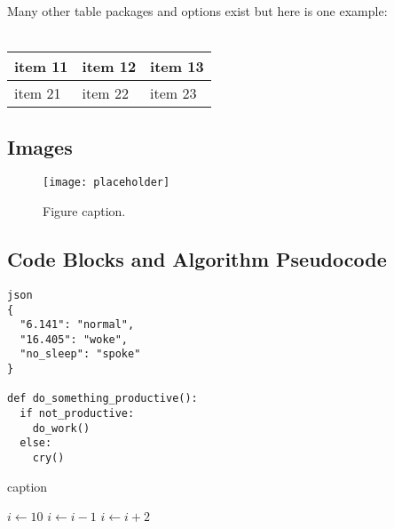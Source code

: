\documentclass{article}
\begin{document}
Many other table packages and options exist but here is one example:\\\\

\begin{tabularx}{0.8\textwidth} {
  | >{\raggedright\arraybackslash}X
  | >{\centering\arraybackslash}X
  | >{\raggedleft\arraybackslash}X | }
 \hline
 item 11 & item 12 & item 13 \\
 \hline
 item 21  & item 22  & item 23  \\
\hline
\end{tabularx}

\subsection{Images}

\begin{figure}[h]
\begin{center}
\texttt{[image: placeholder]} %
\caption{Figure caption.}
\end{center}
\end{figure}

\subsection{Code Blocks and Algorithm Pseudocode}


\begin{lstlisting}
json
{
  "6.141": "normal",
  "16.405": "woke",
  "no_sleep": "spoke"
}

def do_something_productive():
  if not_productive:
    do_work()
  else:
    cry()
\end{lstlisting}


\begin{algorithm}[H]
\SetAlgoLined
 \caption{caption}
\end{algorithm}


\begin{algorithmic}
\STATE $i\gets 10$
        \STATE $i\gets i-1$
\ELSE
                \STATE $i\gets i+2$
        \ENDIF
\ENDIF
\end{algorithmic}
\end{document}
